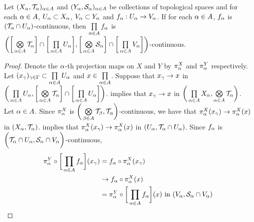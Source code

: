 \documentclass{book}
\begin{document}
	\begin{ex} 
		Let $(X_{\alpha}, \mathcal{T}_{\alpha})_{\alpha \in A}$ and $(Y_{\alpha}, \mathcal{S}_{\alpha})_{\alpha \in A}$ be collections of topological spaces and for each $\alpha \in A$, $U_{\alpha} \subset X_{\alpha}$, $V_{\alpha} \subset Y_{\alpha}$ and $f_{\alpha}:U_{\alpha} \rightarrow V_{\alpha}$. If for each $\alpha \in A$, $f_{\alpha}$ is $(\mathcal{T}_{\alpha} \cap U_{\alpha})$-continuous, then $\prod\limits_{\alpha \in A} f_{\alpha}$ is $\bigg( \bigg[ \bigotimes\limits_{\alpha \in A} \mathcal{T}_{\alpha} \bigg] \cap \bigg[ \prod\limits_{\alpha \in A} U_{\alpha} \bigg], \bigg[ \bigotimes\limits_{\alpha \in A} \mathcal{S}_{\alpha} \bigg] \cap \bigg[ \prod\limits_{\alpha \in A} V_{\alpha} \bigg] \bigg)$-continuous.
	\end{ex}
	
	\begin{proof}
		Denote the $\alpha$-th projection maps on $X$ and $Y$ by $\pi^X_{\alpha}$ and $\pi^Y_{\alpha}$ respectively. Let $(x_{\gamma})_{\gamma \in \Gamma} \subset \prod\limits_{\alpha \in A} U_{\alpha}$ and $x \in \prod\limits_{\alpha \in A}$. Suppose that $x_{\gamma} \rightarrow x$ in $\bigg( \prod\limits_{\alpha \in A} U_{\alpha} , \bigg[ \bigotimes\limits_{\alpha \in A} \mathcal{T}_{\alpha} \bigg] \cap \bigg[ \prod\limits_{\alpha \in A} U_{\alpha} \bigg] \bigg)$.  implies that $x_{\gamma} \rightarrow x$ in $\bigg( \prod\limits_{\alpha \in A} X_{\alpha}, \bigotimes\limits_{\alpha \in A} \mathcal{T}_{\alpha}  \bigg)$. Let $\alpha \in A$. Since $\pi^X_{\alpha}$ is $\bigg(\bigotimes\limits_{\beta \in A} \mathcal{T}_{\beta}, \mathcal{T}_{\alpha} \bigg)$-continuous, we have that $\pi^X_{\alpha}(x_{\gamma}) \rightarrow \pi^X_{\alpha}(x)$ in $(X_{\alpha}, \mathcal{T}_{\alpha})$.  implies that $\pi^X_{\alpha}(x_{\gamma}) \rightarrow \pi^X_{\alpha}(x)$ in $(U_{\alpha}, \mathcal{T}_{\alpha} \cap U_{\alpha})$. Since $f_{\alpha}$ is $\bigg(\mathcal{T}_{\alpha} \cap U_{\alpha}, \mathcal{S}_{\alpha} \cap V_{\alpha} \bigg)$-continuous, 
		\begin{align*}
			\pi^Y_{\alpha} \circ \bigg[ \prod\limits_{\alpha \in A}f_{\alpha} \bigg] (x_{\gamma})
			& = f_{\alpha} \circ \pi^X_{\alpha}(x_{\gamma}) \\
			& \rightarrow f_{\alpha} \circ \pi^X_{\alpha}(x) \\
			& = \pi^Y_{\alpha} \circ \bigg[ \prod\limits_{\alpha \in A}f_{\alpha} \bigg] (x)  \text{ in $(V_{\alpha}, \mathcal{S}_{\alpha} \cap V_{\alpha})$} 
		\end{align*}

\end{proof}
\end{document}
